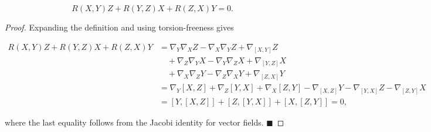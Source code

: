 \begin{proposition}
  \label{prop:dc-ch4-2-4}


  $$
  R(X,Y)Z+R(Y,Z)X+R(Z,X)Y=0.
  $$
\end{proposition}
\begin{proof}

  \sketch
  Expanding the definition and using torsion-freeness gives

  $$
  \begin{aligned}R(X,Y)Z+R(Y,Z)X+R(Z,X)Y&=\nabla_Y\nabla_X Z-\nabla_X\nabla_Y Z+\nabla_{[X,Y]}Z\\&\quad+\nabla_Z\nabla_Y X-\nabla_Y\nabla_Z X+\nabla_{[Y,Z]}X\\&\quad+\nabla_X\nabla_Z Y-\nabla_Z\nabla_X Y+\nabla_{[Z,X]}Y\\&=\nabla_Y[X,Z]+\nabla_Z[Y,X]+\nabla_X[Z,Y]-\nabla_{[X,Z]}Y-\nabla_{[Y,X]}Z-\nabla_{[Z,Y]}X\\&=[Y,[X,Z]]+[Z,[Y,X]]+[X,[Z,Y]]=0,\end{aligned}
  $$

  where the last equality follows from the Jacobi identity for vector fields.
  $\blacksquare$
\end{proof}

